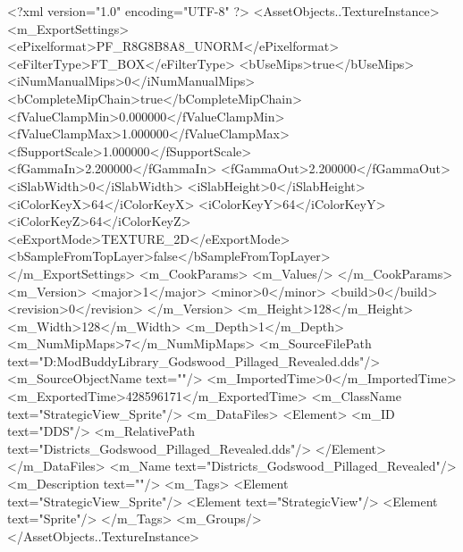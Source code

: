 <?xml version="1.0" encoding="UTF-8" ?>
<AssetObjects..TextureInstance>
	<m_ExportSettings>
		<ePixelformat>PF_R8G8B8A8_UNORM</ePixelformat>
		<eFilterType>FT_BOX</eFilterType>
		<bUseMips>true</bUseMips>
		<iNumManualMips>0</iNumManualMips>
		<bCompleteMipChain>true</bCompleteMipChain>
		<fValueClampMin>0.000000</fValueClampMin>
		<fValueClampMax>1.000000</fValueClampMax>
		<fSupportScale>1.000000</fSupportScale>
		<fGammaIn>2.200000</fGammaIn>
		<fGammaOut>2.200000</fGammaOut>
		<iSlabWidth>0</iSlabWidth>
		<iSlabHeight>0</iSlabHeight>
		<iColorKeyX>64</iColorKeyX>
		<iColorKeyY>64</iColorKeyY>
		<iColorKeyZ>64</iColorKeyZ>
		<eExportMode>TEXTURE_2D</eExportMode>
		<bSampleFromTopLayer>false</bSampleFromTopLayer>
	</m_ExportSettings>
	<m_CookParams>
		<m_Values/>
	</m_CookParams>
	<m_Version>
		<major>1</major>
		<minor>0</minor>
		<build>0</build>
		<revision>0</revision>
	</m_Version>
	<m_Height>128</m_Height>
	<m_Width>128</m_Width>
	<m_Depth>1</m_Depth>
	<m_NumMipMaps>7</m_NumMipMaps>
	<m_SourceFilePath text="D:\MyDocuments\Firaxis ModBuddy\ArtDef Library\RAFOU\StrategicViews\Districts_Godswood_Pillaged_Revealed.dds"/>
	<m_SourceObjectName text=""/>
	<m_ImportedTime>0</m_ImportedTime>
	<m_ExportedTime>428596171</m_ExportedTime>
	<m_ClassName text="StrategicView_Sprite"/>
	<m_DataFiles>
		<Element>
			<m_ID text="DDS"/>
			<m_RelativePath text="Districts_Godswood_Pillaged_Revealed.dds"/>
		</Element>
	</m_DataFiles>
	<m_Name text="Districts_Godswood_Pillaged_Revealed"/>
	<m_Description text=""/>
	<m_Tags>
		<Element text="StrategicView_Sprite"/>
		<Element text="StrategicView"/>
		<Element text="Sprite"/>
	</m_Tags>
	<m_Groups/>
</AssetObjects..TextureInstance>


